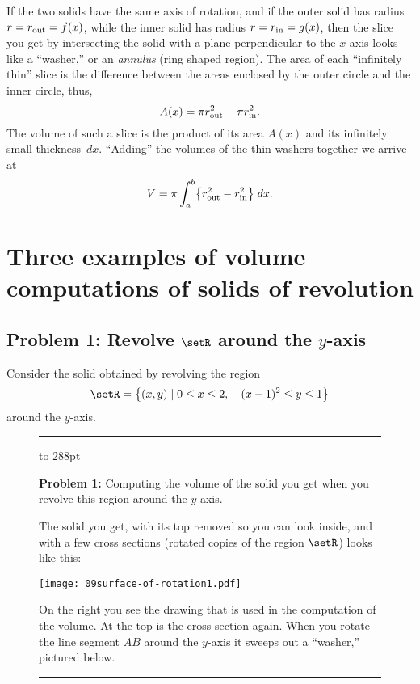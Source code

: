 If the two solids have the same axis of rotation, and if the outer solid has
radius $r= r_{\rm out}=f(x)$, while the inner solid has radius $r=r_{\rm in} =
g(x)$, then the slice you get by intersecting the solid with a plane
perpendicular to the $x$-axis looks like a ``washer,'' or an \emph{annulus}
(ring shaped region).  The area of each ``infinitely thin'' slice is the
difference between the areas enclosed by the outer circle and the inner circle,
thus,
\[
A(x) = \pi r_{\rm out}^2 - \pi r_{\rm in}^2.
\]
The volume of such a slice is the product of its area $A(x)$ and its infinitely
small thickness~$dx$.  ``Adding'' the volumes of the thin washers together we
arrive at
\begin{equation}
  \label{eq:09volume-washers}
  V = \pi \int_a^b \bigl\{r_{\rm out}^2 -r_{\rm in}^2\bigr\}\; dx .
\end{equation}



\section{Three examples of volume computations of solids of revolution}

\subsection{Problem 1: Revolve $\setR$ around the $y$-axis}
\label{sec:09revolver-example1}
Consider the solid obtained by revolving the region
\[
\setR = \bigl\{ (x, y) \mid 0\leq x\leq 2, \quad (x-1)^2\leq y\leq 1\bigr\}
\]
around the $y$-axis.



\begin{figure}[hbt]
  \centering \rule[8pt]{\textwidth}{1pt}
  \begin{minipage}[b]{130pt}
    \vbox to 288pt{\footnotesize\sffamily%
      \textbf{Problem 1: } Computing the volume of the solid you get when you
      revolve this region around the $y$-axis.

      \smallskip

      \centerline{  }

      \smallskip

      The solid you get, with its top removed so you can look inside, and with a
      few cross sections (rotated copies of the region $\setR$) looks like this:
      \vfill

    \texttt{[image: 09surface-of-rotation1.pdf]}
    \vfill

    On the right you see the drawing that is used in the computation of the
    volume. At the top is the cross section again.  When you rotate the line
    segment $AB$ around the $y$-axis it sweeps out a ``washer,'' pictured below.
  }
\end{minipage}%
\begin{minipage}[b]{220pt}
  
\end{minipage}
\rule{\textwidth}{1pt}

\end{figure}


